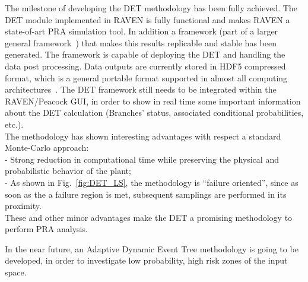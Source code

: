 \label{sec:conclusions}
The milestone of developing the DET methodology has been fully achieved. The DET module implemented in RAVEN is fully functional and makes RAVEN a state-of-art PRA simulation tool. In addition a framework (part of a larger general framework~\cite{RAVENFY13}) that makes this results replicable and stable has been generated. The framework is capable of deploying the DET and handling the data post processing. Data outputs are currently stored in HDF5 compressed format, which is a general portable format supported in almost all computing architectures~\cite{HDF5}.
The DET framework still needs to be integrated within the RAVEN/Peacock GUI, in order to show in real time some important information about the DET calculation (Branches' status, associated conditional probabilities, etc.).
\\The methodology has shown interesting advantages with respect a standard Monte-Carlo approach:
\\ - Strong reduction in computational time while preserving the physical and probabilistic behavior of the plant;
\\ - As shown in Fig.~\ref{fig:DET_LS}, the methodology is ``failure oriented'', since as soon as the a failure region is met, subsequent samplings are performed in its proximity.
\\These and other minor advantages make the DET a promising methodology to perform PRA analysis.

In the near future, an Adaptive Dynamic Event Tree methodology is going to be developed, in order to investigate low probability, high risk zones of the input space.

